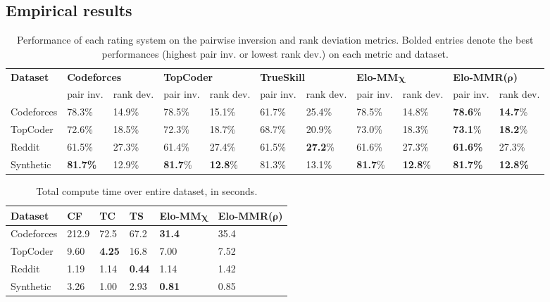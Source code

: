 \subsection{Empirical results}
\begin{table*}
\begin{tabular}{l|ll|ll|ll|ll|ll}
 \hline
\multirow{2}{*}{\textbf{Dataset}} &
  \multicolumn{2}{l|}{\textbf{Codeforces}} &
  \multicolumn{2}{l|}{\textbf{TopCoder}} &
  \multicolumn{2}{l|}{\textbf{TrueSkill}} &
  \multicolumn{2}{l|}{\textbf{Elo-MM$\boldsymbol\chi$}} & 
  \multicolumn{2}{l}{\textbf{Elo-MMR($\boldsymbol\rho$)}} \\ \cline{2-11}
&
  pair inv. &
  rank dev. &
  pair inv. &
  rank dev. &
  pair inv. &
  rank dev. &
  pair inv. &
  rank dev. &
  pair inv. &
  rank dev. \\ \hline
Codeforces & 78.3\% & 14.9\% & 78.5\% & 15.1\% & 61.7\% & 25.4\% & 78.5\% & 14.8\% & {\bf 78.6}\% & {\bf 14.7}\% \\ %
TopCoder  & 72.6\%     & 18.5\%     & 72.3\% & 18.7\%  & 68.7\% & 20.9\% & 73.0\% & 18.3\% & {\bf 73.1}\% & {\bf 18.2}\% \\ %
Reddit     & 61.5\%     & 27.3\%     & 61.4\% & 27.4\% & 61.5\% & {\bf 27.2}\% & 61.6\% & 27.3\% & {\bf 61.6\%} & 27.3\% \\ %
Synthetic  & {\bf 81.7\%}     & 12.9\%     & {\bf 81.7}\% & {\bf 12.8}\% & 81.3\% & 13.1\% & {\bf 81.7}\% & {\bf 12.8}\% & {\bf 81.7\%} & {\bf 12.8\%} \\ \hline
\end{tabular}
\caption{Performance of each rating system on the pairwise inversion and rank deviation metrics. Bolded entries denote the best performances (highest pair inv. or lowest rank dev.) on each metric and dataset.}
\label{tbl:metric-results}
\vspace{-1.2em}
\end{table*}

\begin{table}
\begin{tabular}{l|lllll}
\hline
\textbf{Dataset} & \textbf{CF} & \textbf{TC} & \textbf{TS} & \textbf{Elo-MM$\boldsymbol\chi$} & \textbf{Elo-MMR($\boldsymbol\rho$)} \\ \hline
Codeforces & 212.9 & 72.5 & 67.2 & {\bf 31.4} & 35.4\\
TopCoder   & 9.60 & {\bf 4.25} & 16.8 & 7.00 & 7.52\\
Reddit     & 1.19  & 1.14 & {\bf 0.44} & 1.14 & 1.42 \\
Synthetic  & 3.26  & 1.00 & 2.93 & {\bf 0.81} & 0.85 \\ \hline
\end{tabular}
\caption{Total compute time over entire dataset, in seconds.}
\label{tbl:time-results}
\vspace{-1.2em}
\end{table}

